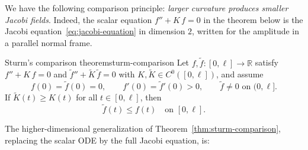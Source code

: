 





We have the following comparison principle: \emph{larger curvature produces smaller Jacobi fields}. Indeed, the scalar equation $f'' + K\,f = 0$ in the theorem below is the Jacobi equation~\eqref{eq:jacobi-equation} in dimension $2$, written for the amplitude in a parallel normal frame.

\begin{colortheo}{Sturm's comparison theorem}{sturm-comparison}
Let $f, \tilde f \colon [0, \ell] \to \mathbb{R}$ satisfy $f'' + K\,f = 0$ and $\tilde f'' + \widetilde K\,\tilde f = 0$ with $K, \widetilde K \in C^0([0, \ell])$, and assume
\[
f(0) = \tilde f(0) = 0, \qquad f'(0) = \tilde f'(0) > 0, \qquad \tilde f \neq 0 \text{ on } (0, \ell].
\]
If $\widetilde K(t) \geqslant K(t)$ for all $t \in [0, \ell]$, then
\[
\tilde f(t) \leqslant f(t) \quad \text{on } [0, \ell].
\]
\end{colortheo}

The higher-dimensional generalization of Theorem~\ref{thm:sturm-comparison}, replacing the scalar ODE by the full Jacobi equation, is:

